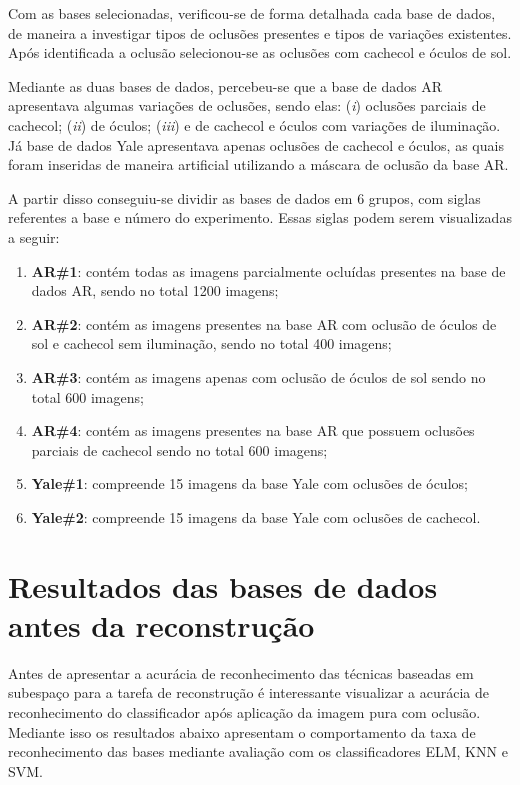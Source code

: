 Com as bases selecionadas, verificou-se de forma detalhada cada base de dados, de maneira a investigar tipos de oclusões presentes e tipos de variações existentes. Após identificada a oclusão selecionou-se as oclusões com cachecol e óculos de sol.

Mediante as duas bases de dados, percebeu-se que a base de dados AR apresentava algumas variações de oclusões, sendo elas: (\textit{i}) oclusões parciais de cachecol; (\textit{ii}) de óculos; (\textit{iii}) e de cachecol e óculos com variações de iluminação. Já base de dados Yale apresentava apenas oclusões de cachecol e óculos, as quais foram inseridas de maneira artificial utilizando a máscara de oclusão da base AR. 

A partir disso conseguiu-se dividir as bases de dados em 6 grupos, com siglas referentes a base e número do experimento. Essas siglas podem serem visualizadas a seguir:


\begin{enumerate}
\item \textbf{AR\#1}: contém todas as imagens parcialmente ocluídas presentes na base de dados AR, sendo no total 1200 imagens;
\item \textbf{AR\#2}: contém as imagens presentes na base AR com oclusão de óculos de sol e cachecol sem iluminação, sendo no total 400 imagens;
\item \textbf{AR\#3}: contém as imagens apenas com oclusão de óculos de sol sendo no total 600 imagens;
\item \textbf{AR\#4}: contém as imagens presentes na base AR que possuem oclusões parciais de cachecol sendo no total 600 imagens;
\item \textbf{Yale\#1}: compreende 15 imagens da base Yale com oclusões de óculos;
\item \textbf{Yale\#2}: compreende 15 imagens da base Yale com oclusões de cachecol. 
\end{enumerate}


\section{Resultados das bases de dados antes da reconstrução}


Antes de apresentar a acurácia de reconhecimento das técnicas baseadas em subespaço para a tarefa de reconstrução é interessante visualizar a acurácia de reconhecimento do classificador após aplicação da imagem pura com oclusão. Mediante isso os resultados abaixo apresentam o comportamento da taxa de reconhecimento das bases mediante avaliação com os classificadores ELM, KNN e SVM.


